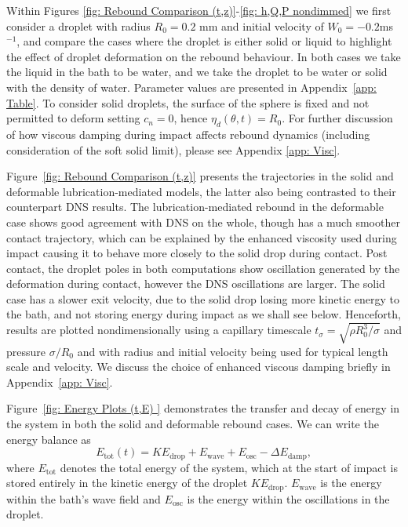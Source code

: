 Within Figures \ref{fig: Rebound Comparison (t,z)}-\ref{fig: h,Q,P nondimmed} we first consider a droplet with radius $R_0 = 0.2$ mm and initial velocity of $W_0 = -0.2$ms$^{-1}$, and compare the cases where the droplet is either solid or liquid to highlight the effect of droplet deformation on the rebound behaviour. In both cases we take the liquid in the bath to be water, and we take the droplet to be water or solid with the density of water. Parameter values are presented in Appendix~\ref{app: Table}. To consider solid droplets, the surface of the sphere is fixed and not permitted to deform setting $c_n=0$, hence $\eta_d(\theta,t) = R_0$. For further discussion of how viscous damping during impact affects rebound dynamics (including consideration of the soft solid limit), please see Appendix \ref{app: Visc}.

 

Figure~\ref{fig: Rebound Comparison (t,z)} presents the trajectories in the solid and deformable lubrication-mediated models, the latter also being contrasted to their counterpart DNS results. The lubrication-mediated rebound in the deformable case shows good agreement with DNS on the whole, though has a much smoother contact trajectory, which can be explained by the enhanced viscosity used during impact causing it to behave more closely to the solid drop during contact. Post contact, the droplet poles in both computations show oscillation generated by the deformation during contact, however the DNS oscillations are larger. The solid case has a slower exit velocity, due to the solid drop losing more kinetic energy to the bath, and not storing energy during impact as we shall see below. Henceforth, results are plotted nondimensionally using a capillary timescale $t_\sigma = \sqrt{\rho R_0^3/\sigma}$ and pressure $\sigma/R_0$ and with radius and initial velocity being used for typical length scale and velocity. 
We discuss the choice of enhanced viscous damping briefly in Appendix~\ref{app: Visc}.


Figure~\ref{fig: Energy Plots (t,E) } demonstrates the transfer and decay of energy in the system in both the solid and deformable rebound cases. We can write the energy balance as 
\begin{equation*}
    E_{\text{tot}}(t) = K\!E_{\text{drop}} + E_{\text{wave}}  + E_{\text{osc}} - \Delta E_{\text{damp}},
\end{equation*}
where $E_{\text{tot}}$ denotes the total energy of the system, which at the start of impact is stored entirely in the kinetic energy of the droplet $ K\!E_{\text{drop}}$. $E_{\text{wave}}$ is the energy within the bath's wave field and $E_{\text{osc}}$ is the energy within the oscillations in the droplet. 

